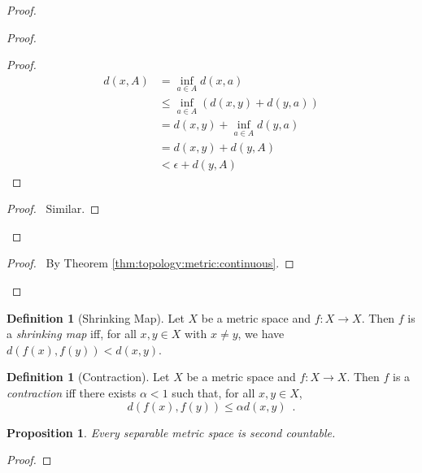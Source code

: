 \documentclass{report}
\let\qed\relax
\newtheorem{prop}[lm]{Proposition}
\theoremstyle{definition}
\newtheorem{df}[lm]{Definition}
\begin{document}
  \begin{proof}
    \pf
    \begin{proof}
      \pf
      \begin{proof}
        \pf
        \begin{align*}
          d(x, A) & = \inf_{a \in A} d(x, a) \\
          & \leq \inf_{a \in A} (d(x, y) + d(y, a)) \\
          & = d(x, y) + \inf_{a \in A} d(y, a) \\
          & = d(x, y) + d(y, A) \\
          & < \epsilon + d(y, A)
        \end{align*}
      \end{proof}
      \begin{proof}
        \pf\ Similar.
      \end{proof}
    \end{proof}
    \qedstep
    \begin{proof}
      \pf\ By Theorem \ref{thm:topology:metric:continuous}.
    \end{proof}
    \qed
  \end{proof}

  \begin{df}[Shrinking Map]
    Let $X$ be a metric space and $f : X \rightarrow X$. Then $f$ is a
    \emph{shrinking map} iff, for all $x, y \in X$ with $x \neq y$, we have
    $d(f(x), f(y)) < d(x, y)$.
  \end{df}

  \begin{df}[Contraction]
    Let $X$ be a metric space and $f : X \rightarrow X$. Then $f$ is a
    \emph{contraction} iff there exists $\alpha < 1$ such that, for all $x, y
    \in X$,
    \[ d(f(x), f(y)) \leq \alpha d(x, y) \enspace . \]
  \end{df}

    \begin{prop}
   Every separable metric space is second countable.
  \end{prop}

  \begin{proof}
   \pf
   \qed
  \end{proof}
\end{document}
